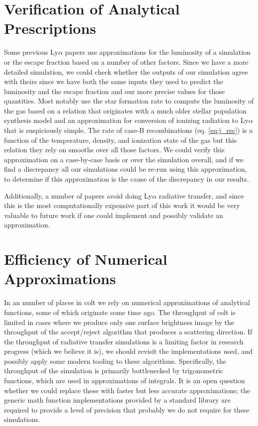 \section{Verification of Analytical Prescriptions}
Some previous Ly$\alpha$ papers use approximations for the luminosity of a simulation or the escape fraction based on a number of other factors.
Since we have a more detailed simulation, we could check whether the outputs of our simulation agree with theirs since we have both the same inputs they used to predict the luminosity and the escape fraction and our more precise values for those quantities.
Most notably \citet{Cen2013} use the star formation rate to compute the luminosity of the gas based on a relation that originates with a much older stellar population synthesis model and an approximation for conversion of ionizing radiation to Ly$\alpha$ that is suspiciously simple.
The rate of case-B recombinations (eq. \ref{eq:j_rec}) is a function of the temperature, density, and ionization state of the gas but this relation they rely on smooths over all those factors.
We could verify this approximation on a case-by-case basis or over the simulation overall, and if we find a discrepancy all our simulations could be re-run using this approximation, to determine if this approximation is the cause of the discrepancy in our results.

Additionally, a number of papers avoid doing Ly$\alpha$ radiative transfer, and since this is the most computationally expensive part of this work it would be very valuable to future work if one could implement and possibly validate an approximation.


\section{Efficiency of Numerical Approximations}
In an number of places in {\sc colt} we rely on numerical approximations of analytical functions, some of which originate some time ago.
The throughput of {\sc colt} is limited in cases where we produce only one surface brightness image by the throughput of the accept/reject algorithm that produces a scattering direction.
If the throughput of radiative transfer simulations is a limiting factor in research progress (which we believe it is), we should revisit the implementations used, and possibly apply some modern tooling to these algorithms.
Specifically, the throughput of the simulation is primarily bottlenecked by trigonometric functions, which are used in approximations of integrals.
It is an open question whether we could replace these with faster but less accurate approximations; the generic math function implementations provided by a standard library are required to provide a level of precision that probably we do not require for these simulations.

